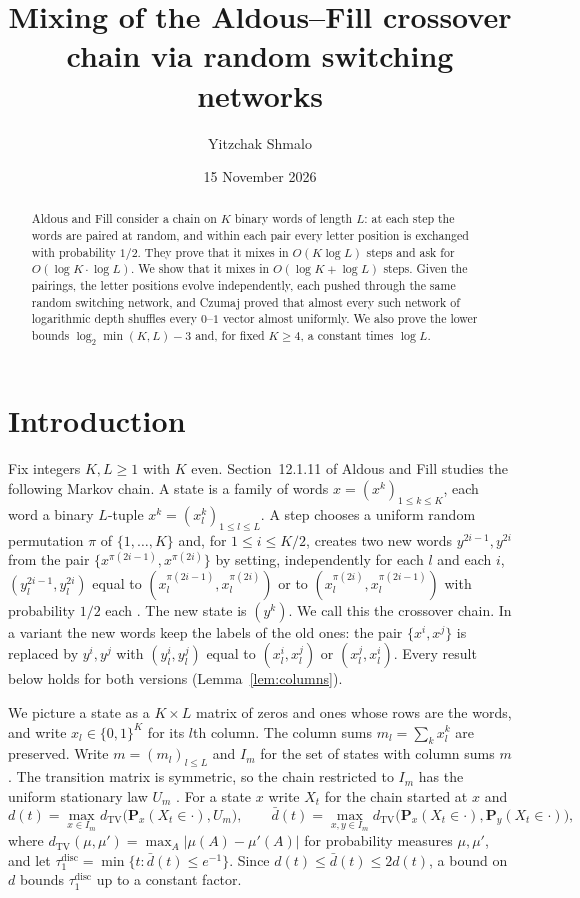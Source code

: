 \documentclass[11pt]{amsart}
\title[Mixing of the crossover chain]{Mixing of the Aldous--Fill crossover chain via random switching networks}
\author{Yitzchak Shmalo}
\date{15 November 2026}
\theoremstyle{remark}
\numberwithin{equation}{section}
\newcommand{\TV}{d_{\mathrm{TV}}}
\newcommand{\Pm}{\mathbf P}
\begin{document}
\begin{abstract}
Aldous and Fill consider a chain on $K$ binary words of length $L$: at each step the words are paired at random, and within each pair every letter position is exchanged with probability $1/2$. They prove that it mixes in $O(K\log L)$ steps and ask for $O(\log K\cdot\log L)$. We show that it mixes in $O(\log K+\log L)$ steps. Given the pairings, the letter positions evolve independently, each pushed through the same random switching network, and Czumaj proved that almost every such network of logarithmic depth shuffles every $0$--$1$ vector almost uniformly. We also prove the lower bounds $\log_2\min(K,L)-3$ and, for fixed $K\ge4$, a constant times $\log L$.
\end{abstract}
\maketitle

\section{Introduction}\label{sec:intro}

Fix integers $K,L\ge1$ with $K$ even. Section~12.1.11 of Aldous and Fill \cite{AF} studies the following Markov chain. A state is a family of words $x=(x^k)_{1\le k\le K}$, each word a binary $L$-tuple $x^k=(x^k_l)_{1\le l\le L}$. A step chooses a uniform random permutation $\pi$ of $\{1,\dots,K\}$ and, for $1\le i\le K/2$, creates two new words $y^{2i-1},y^{2i}$ from the pair $\{x^{\pi(2i-1)},x^{\pi(2i)}\}$ by setting, independently for each $l$ and each $i$, $(y^{2i-1}_l,y^{2i}_l)$ equal to $(x^{\pi(2i-1)}_l,x^{\pi(2i)}_l)$ or to $(x^{\pi(2i)}_l,x^{\pi(2i-1)}_l)$ with probability $1/2$ each \cite[(12.13)]{AF}. The new state is $(y^k)$. We call this the crossover chain. In a variant the new words keep the labels of the old ones: the pair $\{x^i,x^j\}$ is replaced by $y^i,y^j$ with $(y^i_l,y^j_l)$ equal to $(x^i_l,x^j_l)$ or $(x^j_l,x^i_l)$. Every result below holds for both versions (Lemma~\ref{lem:columns}).

We picture a state as a $K\times L$ matrix of zeros and ones whose rows are the words, and write $x_l\in\{0,1\}^K$ for its $l$th column. The column sums $m_l=\sum_k x^k_l$ are preserved. Write $m=(m_l)_{l\le L}$ and $I_m$ for the set of states with column sums $m$. The transition matrix is symmetric, so the chain restricted to $I_m$ has the uniform stationary law $U_m$ \cite{AF}. For a state $x$ write $X_t$ for the chain started at $x$ and
\begin{equation}\label{eq:d}
d(t)=\max_{x\in I_m}\TV\bigl(\Pm_x(X_t\in\cdot),U_m\bigr),\qquad \bar d(t)=\max_{x,y\in I_m}\TV\bigl(\Pm_x(X_t\in\cdot),\Pm_y(X_t\in\cdot)\bigr),
\end{equation}
where $\TV(\mu,\mu')=\max_A|\mu(A)-\mu'(A)|$ for probability measures $\mu,\mu'$, and let $\tau_1^{\mathrm{disc}}=\min\{t:\bar d(t)\le e^{-1}\}$. Since $d(t)\le\bar d(t)\le 2d(t)$, a bound on $d$ bounds $\tau_1^{\mathrm{disc}}$ up to a constant factor.
\end{document}
